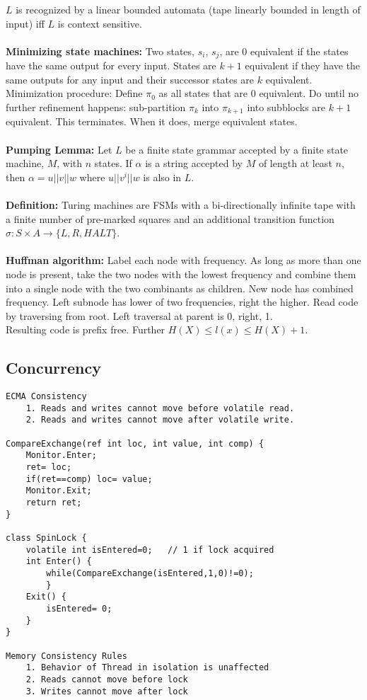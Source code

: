 $L$ is recognized by a linear bounded automata  (tape linearly bounded in length of
input) iff $L$ is context sensitive.
\\
\\
{\bf Minimizing state machines:} Two states, $s_i$, $s_j$, are $0$ equivalent if
the states have the same output for every input.  States are $k+1$ equivalent if they
have the same outputs for any input and their successor states are $k$ equivalent.
Minimization procedure:  Define $\pi_0$ as all states that are $0$ equivalent.  Do until
no further refinement happens: sub-partition $\pi_{k}$ into $\pi_{k+1}$ into subblocks are
$k+1$ equivalent.  This terminates.  When it does, merge equivalent states.
\\
\\
{\bf Pumping Lemma:}  Let $L$ be a finite state grammar accepted by a finite state
machine, $M$, with $n$ states.
If $\alpha$ is a string accepted by $M$ of length at least $n$, then
$\alpha = u||v||w$ where $u||v^i||w$ is also in $L$.\\
\\
{\bf Definition:}
Turing machines are FSMs with a bi-directionally infinite tape with a finite
number of pre-marked squares and an additional transition function
$\sigma: S \times A \rightarrow \{L, R, HALT\}$.
\\
\\
{\bf Huffman algorithm:}  Label each node with frequency.  As long as more than one
node is present, take the two nodes with the lowest frequency and combine them
into a single node with the two combinants as children.
New node has combined frequency.  Left subnode has lower of two frequencies,
right the higher.  Read code by traversing from root.  Left traversal at parent is
0, right, 1.
\\
Resulting code is prefix free.  Further $H(X) \leq l(x) \leq H(X)+1$.
\subsection{Concurrency}
\begin{verbatim}
ECMA Consistency
    1. Reads and writes cannot move before volatile read.
    2. Reads and writes cannot move after volatile write.

CompareExchange(ref int loc, int value, int comp) {
    Monitor.Enter;
    ret= loc;
    if(ret==comp) loc= value;
    Monitor.Exit;
    return ret;
}

class SpinLock {
    volatile int isEntered=0;   // 1 if lock acquired
    int Enter() {
        while(CompareExchange(isEntered,1,0)!=0);
        }
    Exit() {
        isEntered= 0;
    }
}

Memory Consistency Rules
    1. Behavior of Thread in isolation is unaffected
    2. Reads cannot move before lock
    3. Writes cannot move after lock
\end{verbatim}

